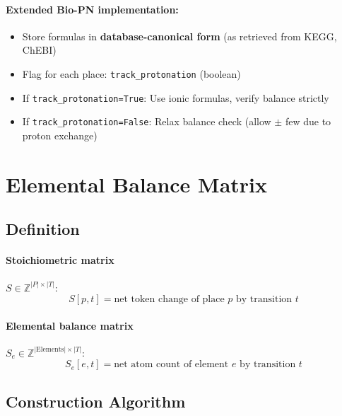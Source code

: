 \paragraph{Extended Bio-PN implementation:}
\begin{itemize}
    \item Store formulas in \textbf{database-canonical form} (as retrieved from KEGG, ChEBI)
    \item Flag for each place: \texttt{track\_protonation} (boolean)
    \item If \texttt{track\_protonation=True}: Use ionic formulas, verify  balance strictly
    \item If \texttt{track\_protonation=False}: Relax  balance check (allow $\pm$ few  due to proton exchange)
\end{itemize}

\section{Elemental Balance Matrix}
\label{sec:balance-matrix}

\subsection{Definition}
\label{subsec:balance-matrix-def}

\paragraph{Stoichiometric matrix} $S \in \mathbb{Z}^{|P| \times |T|}$: 
\begin{equation}
S[p,t] = \text{net token change of place } p \text{ by transition } t
\end{equation}

\paragraph{Elemental balance matrix} $S_e \in \mathbb{Z}^{|\text{Elements}| \times |T|}$:
\begin{equation}
S_e[e,t] = \text{net atom count of element } e \text{ by transition } t
\end{equation}

\subsection{Construction Algorithm}
\label{subsec:balance-matrix-construction}

